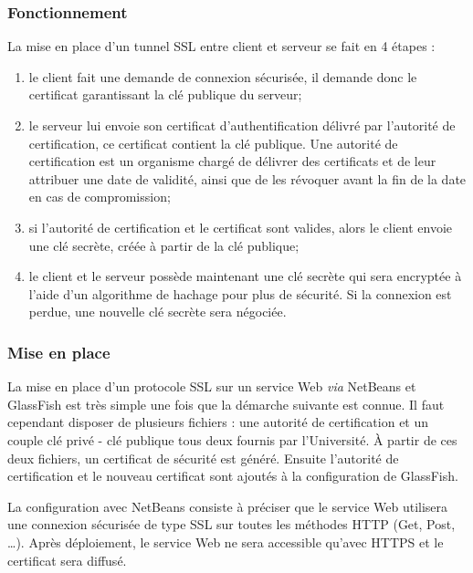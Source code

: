 \subsubsection{Fonctionnement}

\noindent La mise en place d'un tunnel SSL entre client et serveur se fait en 4 \'etapes :

\begin{enumerate}
	\item le client fait une demande de connexion s\'ecuris\'ee, il demande donc le certificat garantissant la cl\'e publique du serveur;
	\item le serveur lui envoie son certificat d'authentification d\'elivr\'e par l'autorit\'e de certification, ce certificat contient la cl\'e publique.
	Une autorit\'e de certification est un organisme charg\'e de d\'elivrer des certificats et de leur attribuer une date de validit\'e, ainsi que de les r\'evoquer avant la fin de la date en cas de compromission;
	\item si l'autorit\'e de certification et le certificat sont valides, alors le client envoie une cl\'e secr\`ete, cr\'e\'ee \`a partir de la cl\'e publique;
	\item le client et le serveur poss\`ede maintenant une cl\'e secr\`ete qui sera encrypt\'ee \`a l'aide d'un algorithme de hachage pour plus de s\'ecurit\'e.
	Si la connexion est perdue, une nouvelle cl\'e secr\`ete sera n\'egoci\'ee.

\end{enumerate}

\subsubsection{Mise en place}

La mise en place d'un protocole SSL sur un service Web \textit{via} NetBeans et GlassFish est tr\`es simple une fois que la d\'emarche suivante est connue.
Il faut cependant disposer de plusieurs fichiers : une autorit\'e de certification et un couple cl\'e priv\'e - cl\'e publique tous deux fournis par l'Universit\'e.
\`A partir de ces deux fichiers, un certificat de s\'ecurit\'e est g\'en\'er\'e.
Ensuite l'autorit\'e de certification et le nouveau certificat sont ajout\'es \`a la configuration de GlassFish.

La configuration avec NetBeans consiste \`a pr\'eciser que le service Web utilisera une connexion s\'ecuris\'ee de type SSL sur toutes les m\'ethodes HTTP (Get, Post, \ldots).
Apr\`es d\'eploiement, le service Web ne sera accessible qu'avec HTTPS et le certificat sera diffus\'e.


